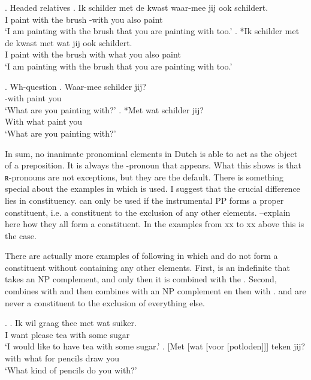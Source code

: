 \documentclass{article}
\begin{document}
\ex. Headed relatives\label{ex:headed}
\ag. Ik schilder met de kwast waar-mee jij ook schildert.\\
 I paint with the brush -with you also paint\\
 `I am painting with the brush that you are painting with too.'
\bg. *Ik schilder met de kwast met wat jij ook schildert.\\
 I paint with the brush with what you also paint\\
 `I am painting with the brush that you are painting with too.'

\ex. Wh-question\label{ex:wh}
\ag.  Waar-mee schilder jij?\\
 -with paint you\\
 `What are you painting with?'
\bg. *Met wat schilder jij?\\
 With what paint you\\
 `What are you painting with?'

In sum, no inanimate pronominal elements in Dutch is able to act as the object of a preposition. It is always the -pronoun that appears. What this shows is that ʀ-pronouns are not exceptions, but they are the default. There is something special about the examples in which  is used. I suggest that the crucial difference lies in constituency.  can only be used if the instrumental PP forms a proper constituent, i.e. a constituent to the exclusion of any other elements. --explain here how they all form a constituent. In the examples from xx to xx above this is the case.

There are actually more examples of  following  in which  and  do not form a constituent without containing any other elements. First,  is an indefinite that takes an NP complement, and only then it is combined with the . Second,  combines with  and then combines with an NP complement en then with .  and  are never a constituent to the exclusion of everything else.

\ex.
\ag. Ik wil graag thee met wat suiker.\\
 I want please tea with some sugar\\
 `I would like to have tea with some sugar.'
\bg. [Met [wat [voor [potloden]]] teken jij?\\
 with what for pencils draw you\\
 `What kind of pencils do you with?'
\end{document}
